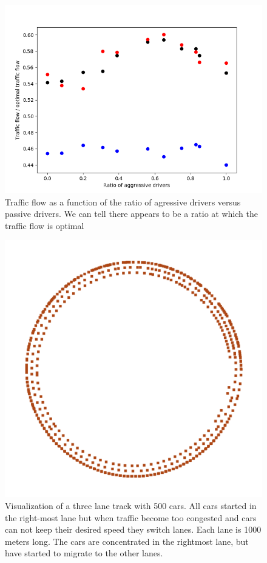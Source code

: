 \documentclass[11pt,a4paper,twocolumn]{article}
\begin{document}
\begin{figure}[h]
    \centering
    \includegraphics[scale=0.4]{figs/jam_flow_aggresives_150.png}
    \caption{Traffic flow as a function of the ratio of agressive drivers versus passive drivers. We can tell there appears to be a ratio at which the traffic flow is optimal}
    \label{fig:jam_flow}
\end{figure}

\begin{figure}[h]
    \centering
    \includegraphics[scale=0.2]{figs/circular_three_lane.png}
    \caption{Visualization of a three lane track with 500 cars. All cars started in the right-most lane but when traffic become too congested and cars can not keep their desired speed they switch lanes. Each lane is 1000 meters long. The cars are concentrated in the rightmost lane, but have started to migrate to the other lanes.}
    \label{fig:a3lanes}
\end{figure}
\end{document}
